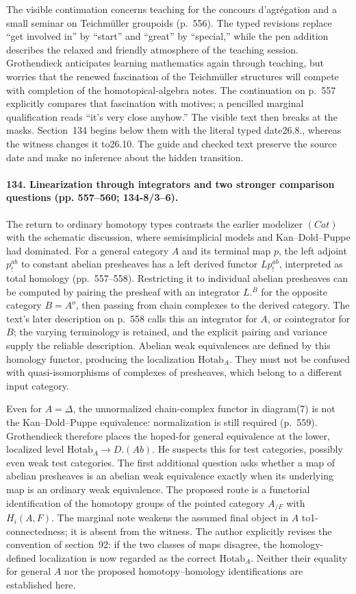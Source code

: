 The visible continuation concerns teaching for the concours d'agr\'egation and a small seminar on Teichm\"uller groupoids (p.~556). The typed revisions replace ``get involved in'' by ``start'' and ``great'' by ``special,'' while the pen addition describes the relaxed and friendly atmosphere of the teaching session. Grothendieck anticipates learning mathematics again through teaching, but worries that the renewed fascination of the Teichm\"uller structures will compete with completion of the homotopical-algebra notes. The continuation on p.~557 explicitly compares that fascination with motives; a pencilled marginal qualification reads ``it's very close anyhow.'' The visible text then breaks at the masks. Section~134 begins below them with the literal typed date26.8., whereas the witness changes it to26.10. The guide and checked text preserve the source date and make no inference about the hidden transition.

\paragraph{134. Linearization through integrators and two stronger comparison questions (pp. 557--560; 134-8/3--6).}
The return to ordinary homotopy types contrasts the earlier modelizer $(Cat)$ with the schematic discussion, where semisimplicial models and Kan--Dold--Puppe had dominated. For a general category $A$ and its terminal map $p$, the left adjoint $p^{ab}_{!}$ to constant abelian presheaves has a left derived functor $Lp^{ab}_{!}$, interpreted as total homology (pp.~557--558). Restricting it to individual abelian presheaves can be computed by pairing the presheaf with an integrator $L.^B$ for the opposite category $B=A^o$, then passing from chain complexes to the derived category. The text's later description on p.~558 calls this an integrator for $A$, or cointegrator for $B$; the varying terminology is retained, and the explicit pairing and variance supply the reliable description. Abelian weak equivalences are defined by this homology functor, producing the localization $\mathrm{Hotab}_A$. They must not be confused with quasi-isomorphisms of complexes of presheaves, which belong to a different input category.

Even for $A=\Delta$, the unnormalized chain-complex functor in diagram(7) is not the Kan--Dold--Puppe equivalence: normalization is still required (p.~559). Grothendieck therefore places the hoped-for general equivalence at the lower, localized level $\mathrm{Hotab}_A\to D.(Ab)$. He suspects this for test categories, possibly even weak test categories. The first additional question asks whether a map of abelian presheaves is an abelian weak equivalence exactly when its underlying map is an ordinary weak equivalence. The proposed route is a functorial identification of the homotopy groups of the pointed category $A_{/F}$ with $H_i(A,F)$. The marginal note weakens the assumed final object in $A$ to1-connectedness; it is absent from the witness. The author explicitly revises the convention of section~92: if the two classes of maps disagree, the homology-defined localization is now regarded as the correct $\mathrm{Hotab}_A$. Neither their equality for general $A$ nor the proposed homotopy--homology identifications are established here.

